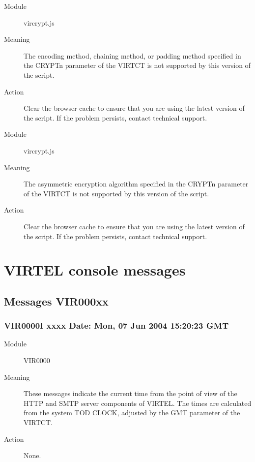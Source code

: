 \documentclass[letterpaper,10pt,english]{sphinxmanual}
\begin{document}
\begin{description}
\item[{Module}] \leavevmode
vircrypt.js

\item[{Meaning}] \leavevmode
The encoding method, chaining method, or padding method specified in the CRYPTn parameter of the VIRTCT is not supported by this version of the script.

\item[{Action}] \leavevmode
Clear the browser cache to ensure that you are using the latest version of the script. If the problem persists, contact technical support.

\end{description}

\begin{description}
\item[{Module}] \leavevmode
vircrypt.js

\item[{Meaning}] \leavevmode
The asymmetric encryption algorithm specified in the CRYPTn parameter of the VIRTCT is not supported by this version of the script.

\item[{Action}] \leavevmode
Clear the browser cache to ensure that you are using the latest version of the script. If the problem persists, contact technical support.

\end{description}


\section{VIRTEL console messages}
\label{\detokenize{messages:virtel-console-messages}}

\subsection{Messages VIR000xx}
\label{\detokenize{messages:messages-vir000xx}}

\subsubsection{VIR0000I xxxx Date: Mon, 07 Jun 2004 15:20:23 GMT}
\label{\detokenize{messages:vir0000i-xxxx-date-mon-07-jun-2004-15-20-23-gmt}}\begin{description}
\item[{Module}] \leavevmode
VIR0000

\item[{Meaning}] \leavevmode
These messages indicate the current time from the point of view of the HTTP and SMTP server components of VIRTEL. The times are calculated from the system TOD CLOCK, adjusted by the GMT parameter of the VIRTCT.

\item[{Action}] \leavevmode
None.

\end{description}
\end{document}
